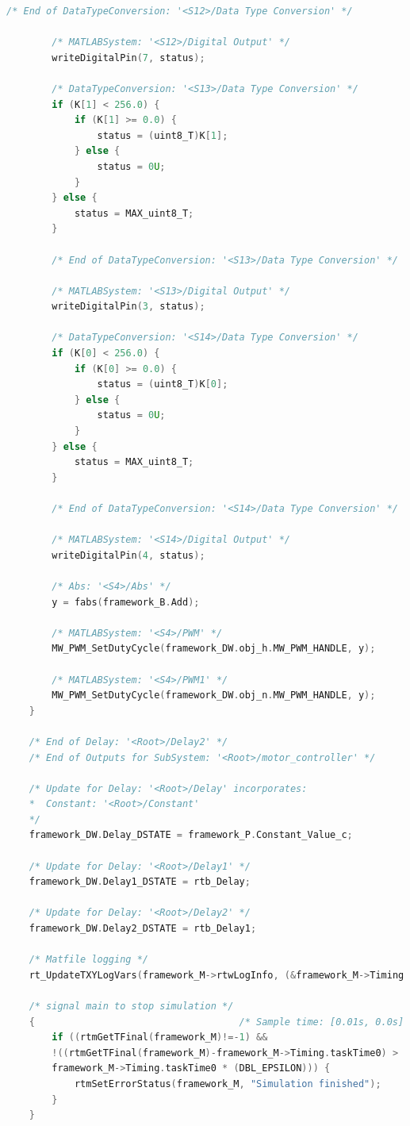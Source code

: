 \begin{lstlisting}[caption={Automatically generated C code}, language=c,firstnumber=407,label={lst:acg2}]
		/* End of DataTypeConversion: '<S12>/Data Type Conversion' */
		
		/* MATLABSystem: '<S12>/Digital Output' */
		writeDigitalPin(7, status);
		
		/* DataTypeConversion: '<S13>/Data Type Conversion' */
		if (K[1] < 256.0) {
			if (K[1] >= 0.0) {
				status = (uint8_T)K[1];
			} else {
				status = 0U;
			}
		} else {
			status = MAX_uint8_T;
		}
		
		/* End of DataTypeConversion: '<S13>/Data Type Conversion' */
		
		/* MATLABSystem: '<S13>/Digital Output' */
		writeDigitalPin(3, status);
		
		/* DataTypeConversion: '<S14>/Data Type Conversion' */
		if (K[0] < 256.0) {
			if (K[0] >= 0.0) {
				status = (uint8_T)K[0];
			} else {
				status = 0U;
			}
		} else {
			status = MAX_uint8_T;
		}
		
		/* End of DataTypeConversion: '<S14>/Data Type Conversion' */
		
		/* MATLABSystem: '<S14>/Digital Output' */
		writeDigitalPin(4, status);
		
		/* Abs: '<S4>/Abs' */
		y = fabs(framework_B.Add);
		
		/* MATLABSystem: '<S4>/PWM' */
		MW_PWM_SetDutyCycle(framework_DW.obj_h.MW_PWM_HANDLE, y);
		
		/* MATLABSystem: '<S4>/PWM1' */
		MW_PWM_SetDutyCycle(framework_DW.obj_n.MW_PWM_HANDLE, y);
	}
	
	/* End of Delay: '<Root>/Delay2' */
	/* End of Outputs for SubSystem: '<Root>/motor_controller' */
	
	/* Update for Delay: '<Root>/Delay' incorporates:
	*  Constant: '<Root>/Constant'
	*/
	framework_DW.Delay_DSTATE = framework_P.Constant_Value_c;
	
	/* Update for Delay: '<Root>/Delay1' */
	framework_DW.Delay1_DSTATE = rtb_Delay;
	
	/* Update for Delay: '<Root>/Delay2' */
	framework_DW.Delay2_DSTATE = rtb_Delay1;
	
	/* Matfile logging */
	rt_UpdateTXYLogVars(framework_M->rtwLogInfo, (&framework_M->Timing.taskTime0));
	
	/* signal main to stop simulation */
	{                                    /* Sample time: [0.01s, 0.0s] */
		if ((rtmGetTFinal(framework_M)!=-1) &&
		!((rtmGetTFinal(framework_M)-framework_M->Timing.taskTime0) >
		framework_M->Timing.taskTime0 * (DBL_EPSILON))) {
			rtmSetErrorStatus(framework_M, "Simulation finished");
		}
	}
	

\end{lstlisting}
